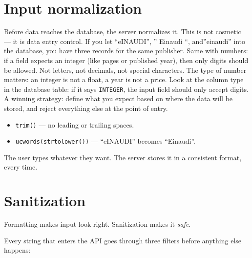 \documentclass[11pt,a4paper,oneside]{book}
\newenvironment{Shaded}{\begin{snugshade}}{\end{snugshade}}
\newcommand{\DecValTok}[1]{\textcolor[HTML]{40A070}{#1}}
\newcommand{\StringTok}[1]{\textcolor[HTML]{4070A0}{#1}}
\newcommand{\OtherTok}[1]{\textcolor[HTML]{007020}{#1}}
\newcommand{\FunctionTok}[1]{\textcolor[HTML]{06287E}{#1}}
\newcommand{\VariableTok}[1]{\textcolor[HTML]{19177C}{#1}}
\newcommand{\OperatorTok}[1]{\textcolor[HTML]{666666}{#1}}
\newcommand{\NormalTok}[1]{#1}
\providecommand{\tightlist}{%
  \setlength{\itemsep}{0pt}\setlength{\parskip}{0pt}}
\begin{document}
\hypertarget{input-normalization}{%
\section{Input normalization}\label{input-normalization}}

Before data reaches the database, the server normalizes it. This
is not cosmetic --- it is data entry control. If you let
``eINAUDI'', '' Einaudi ``, and''einaudi'' into the database, you
have three records for the same publisher. Same with numbers: if
a field expects an integer (like pages or published year), then
only digits should be allowed. Not letters, not decimals, not
special characters. The type of number matters: an integer is not
a float, a year is not a price. Look at the column type in the
database table: if it says \texttt{INTEGER}, the input field
should only accept digits. A winning strategy: define what you
expect based on where the data will be stored, and reject
everything else at the point of entry.

\begin{itemize}
\tightlist
\item
  \texttt{trim()} --- no leading or trailing spaces.
\item
  \texttt{ucwords(strtolower())} --- ``eINAUDI'' becomes
  ``Einaudi''.
\end{itemize}

The user types whatever they want. The server stores it in a
consistent format, every time.

\hypertarget{sanitization}{%
\section{Sanitization}\label{sanitization}}

Formatting makes input look right. Sanitization makes it
\emph{safe}.

Every string that enters the API goes through three filters
before anything else happens:

\begin{Shaded}
\end{Shaded}
\end{document}
